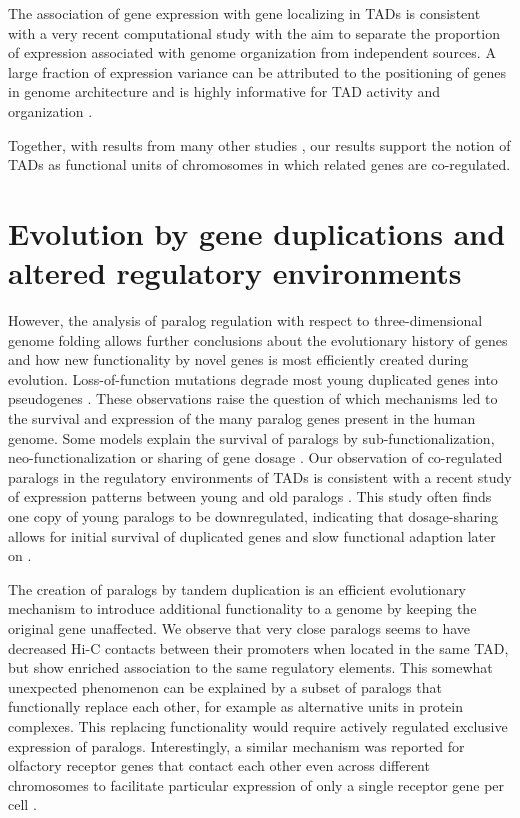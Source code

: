 \documentclass[a4paper,twoside=true,openright,parskip=full,chapterprefix=true,11pt,headings=normal,bibliography=totoc,listof=totoc,titlepage=on,captions=tableabove,draft=false]{scrreprt}
\theoremstyle{definition}
\theoremstyle{definition}
\theoremstyle{definition}
\theoremstyle{remark}
\begin{document}
The association of gene expression with gene localizing in TADs is
consistent with a very recent computational study with the aim to
separate the proportion of expression associated with genome
organization from independent sources. A large fraction of expression
variance can be attributed to the positioning of genes in genome
architecture and is highly informative for TAD activity and organization
\citep{Rennie2018}.

Together, with results from many other studies
\citep{Bonev2016, Andrey2017, Hnisz2016a}, our results support the
notion of TADs as functional units of chromosomes in which related genes
are co-regulated.

\hypertarget{evolution-by-gene-duplications-and-altered-regulatory-environments}{%
\section{Evolution by gene duplications and altered regulatory
environments}\label{evolution-by-gene-duplications-and-altered-regulatory-environments}}

However, the analysis of paralog regulation with respect to
three-dimensional genome folding allows further conclusions about the
evolutionary history of genes and how new functionality by novel genes
is most efficiently created during evolution. Loss-of-function mutations
degrade most young duplicated genes into pseudogenes \citep{Lynch2003}.
These observations raise the question of which mechanisms led to the
survival and expression of the many paralog genes present in the human
genome. Some models explain the survival of paralogs by
sub-functionalization, neo-functionalization or sharing of gene dosage
\citep{Innan2010}. Our observation of co-regulated paralogs in the
regulatory environments of TADs is consistent with a recent study of
expression patterns between young and old paralogs \citep{Lan2016}. This
study often finds one copy of young paralogs to be downregulated,
indicating that dosage-sharing allows for initial survival of duplicated
genes and slow functional adaption later on \citep{Lan2016}.

The creation of paralogs by tandem duplication is an efficient
evolutionary mechanism to introduce additional functionality to a genome
by keeping the original gene unaffected. We observe that very close
paralogs seems to have decreased Hi-C contacts between their promoters
when located in the same TAD, but show enriched association to the same
regulatory elements. This somewhat unexpected phenomenon can be
explained by a subset of paralogs that functionally replace each other,
for example as alternative units in protein complexes. This replacing
functionality would require actively regulated exclusive expression of
paralogs. Interestingly, a similar mechanism was reported for olfactory
receptor genes that contact each other even across different chromosomes
to facilitate particular expression of only a single receptor gene per
cell \citep{Monahan2015, Monahan2017}.
\end{document}

